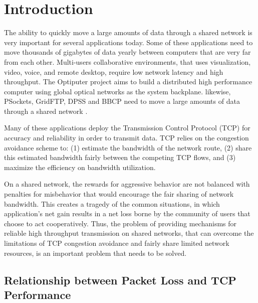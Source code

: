 \documentclass[a4paper, conference]{IEEEtran}
\begin{document}
\section{Introduction}



The ability to quickly move a large amounts of data through a shared network is very important for several applications today. Some of these applications need to move thousands of gigabytes of data yearly between computers that are very far from each other. Multi-users collaborative environments, that uses visualization, video, voice, and remote desktop, require low network latency and high throughput. The Optiputer project aims to build a distributed high performance computer using global optical networks as the system backplane. likewise, PSockets, GridFTP, DPSS and BBCP need to move a large amounts of data through a shared network \cite{hacker2004b}.

Many of these applications deploy the Transmission Control Protocol (TCP) for accuracy and reliability in order to transmit data. TCP relies on the congestion avoidance scheme to: (1) estimate the bandwidth of the network route, (2) share this estimated bandwidth fairly between the competing TCP flows, and (3) maximize the efficiency on bandwidth utilization.

On a shared network, the rewards for aggressive behavior are not balanced with penalties for misbehavior that would encourage the fair sharing of network bandwidth. This creates a tragedy of the common situations, in which application's net gain results in a net loss borne by the community of users that choose to act cooperatively. Thus, the problem of providing mechanisms for reliable high throughput transmission on shared networks, that can overcome the limitations of TCP congestion avoidance and fairly share limited network resources, is an important problem that needs to be solved.

\subsection{Relationship between Packet Loss and TCP Performance}
\end{document}
